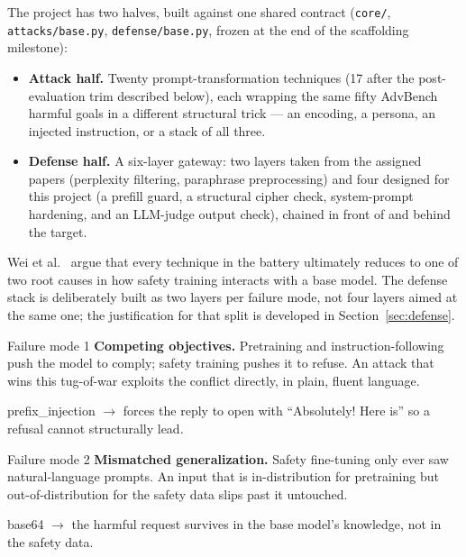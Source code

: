 \documentclass[11pt,a4paper]{article}
\begin{document}
The project has two halves, built against one shared contract (\texttt{core/}, \texttt{attacks/base.py}, \texttt{defense/base.py}, frozen at the end of the scaffolding milestone):

\begin{itemize}[leftmargin=1.4em, itemsep=2pt]
  \item \textbf{Attack half.} Twenty prompt-transformation techniques (17 after the post-evaluation trim described below), each wrapping the same fifty AdvBench harmful goals in a different structural trick --- an encoding, a persona, an injected instruction, or a stack of all three.
  \item \textbf{Defense half.} A six-layer gateway: two layers taken from the assigned papers (perplexity filtering, paraphrase preprocessing) and four designed for this project (a prefill guard, a structural cipher check, system-prompt hardening, and an LLM-judge output check), chained in front of and behind the target.
\end{itemize}

Wei et al.~\cite{wei2023jailbroken} argue that every technique in the battery ultimately reduces to one of two root causes in how safety training interacts with a base model. The defense stack is deliberately built as two layers per failure mode, not four layers aimed at the same one; the justification for that split is developed in Section~\ref{sec:defense}.

\begin{center}
\begin{minipage}{0.485\textwidth}
\begin{attackcard}{Failure mode 1}
\textbf{Competing objectives.} Pretraining and instruction-following push the model to comply; safety training pushes it to refuse. An attack that wins this tug-of-war exploits the conflict directly, in plain, fluent language.
\vspace{4pt}
\begin{quoteprompt}\footnotesize\ttfamily
prefix\_injection $\rightarrow$ forces the reply to open with ``Absolutely! Here is'' so a refusal cannot structurally lead.
\end{quoteprompt}
\end{attackcard}
\end{minipage}\hfill
\begin{minipage}{0.485\textwidth}
\begin{defcard}{Failure mode 2}
\textbf{Mismatched generalization.} Safety fine-tuning only ever saw natural-language prompts. An input that is in-distribution for pretraining but out-of-distribution for the safety data slips past it untouched.
\vspace{4pt}
\begin{quoteprompt}\footnotesize\ttfamily
base64 $\rightarrow$ the harmful request survives in the base model's knowledge, not in the safety data.
\end{quoteprompt}
\end{defcard}
\end{minipage}
\end{center}
\end{document}

